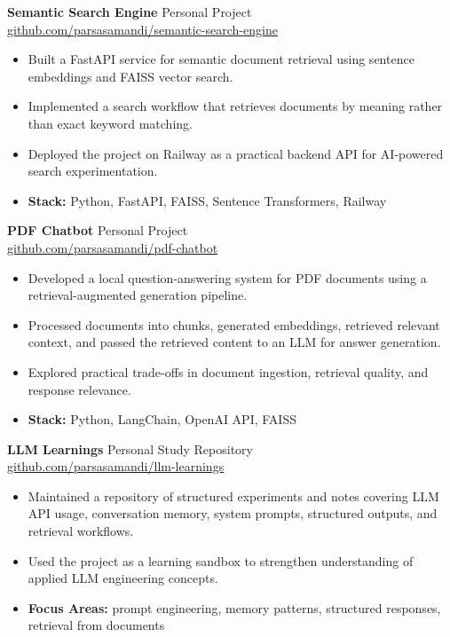 \documentclass[10pt,letterpaper]{article}
\begin{document}
\textbf{Semantic Search Engine} \hfill Personal Project\\
\href{https://github.com/parsasamandi/semantic-search-engine}{github.com/parsasamandi/semantic-search-engine}
\begin{itemize}
    \item Built a FastAPI service for semantic document retrieval using sentence embeddings and FAISS vector search.
    \item Implemented a search workflow that retrieves documents by meaning rather than exact keyword matching.
    \item Deployed the project on Railway as a practical backend API for AI-powered search experimentation.
    \item \textbf{Stack:} Python, FastAPI, FAISS, Sentence Transformers, Railway
\end{itemize}

\vspace{3pt}

\textbf{PDF Chatbot} \hfill Personal Project\\
\href{https://github.com/parsasamandi/pdf-chatbot}{github.com/parsasamandi/pdf-chatbot}
\begin{itemize}
    \item Developed a local question-answering system for PDF documents using a retrieval-augmented generation pipeline.
    \item Processed documents into chunks, generated embeddings, retrieved relevant context, and passed the retrieved content to an LLM for answer generation.
    \item Explored practical trade-offs in document ingestion, retrieval quality, and response relevance.
    \item \textbf{Stack:} Python, LangChain, OpenAI API, FAISS
\end{itemize}

\vspace{3pt}

\textbf{LLM Learnings} \hfill Personal Study Repository\\
\href{https://github.com/parsasamandi/llm-learnings}{github.com/parsasamandi/llm-learnings}
\begin{itemize}
    \item Maintained a repository of structured experiments and notes covering LLM API usage, conversation memory, system prompts, structured outputs, and retrieval workflows.
    \item Used the project as a learning sandbox to strengthen understanding of applied LLM engineering concepts.
    \item \textbf{Focus Areas:} prompt engineering, memory patterns, structured responses, retrieval from documents
\end{itemize}
\end{document}
